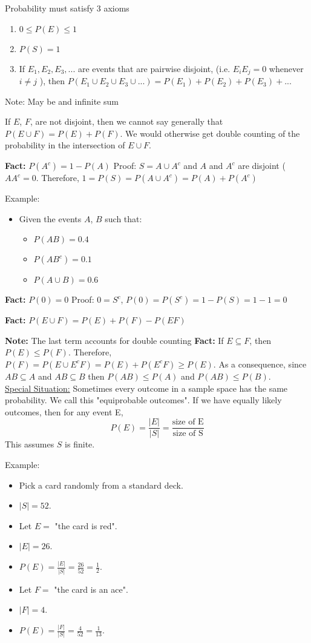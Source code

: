\documentclass[10pt]{article}
\begin{document}
Probability must satisfy 3 axioms
\begin{enumerate}
    \item $ 0 \leq P(E) \leq 1 $
    \item $ P(S) = 1 $
    \item If $E_1, E_2, E_3, ... $ are events that are pairwise disjoint, (i.e.
        $E_iE_j = 0$ whenever $i \neq j$ ), then $P(E_1 \cup E_2 \cup E_3 \cup
        ... ) = P(E_1) + P(E_2) + P(E_3) + ... $
\end{enumerate}
Note: May be and infinite sum

If $E$, $F$, are not disjoint, then we cannot say generally that $P(E \cup F) =
P(E) + P(F)$. We would otherwise get double counting of the probability in the
intersection of $E \cup F$.

\textbf{Fact:} $P(A^c) = 1 - P(A)$
Proof: $S = A \cup A^c$ and $A$ and $A^c$ are disjoint ($AA^c = 0$. Therefore, $1
= P(S) = P(A \cup A^c) = P(A) + P(A^c) $

Example:
\begin{itemize}
    \item Given the events $A$, $B$ such that:
        \begin{itemize}
            \item $P(AB) = 0.4$
            \item $P(AB^c) = 0.1$
            \item $P(A \cup B) = 0.6$
        \end{itemize}
\end{itemize}

\textbf{Fact:} $P(0) = 0$
Proof: $0 = S^c$, $P(0) = P(S^c) = 1 - P(S) = 1 - 1 = 0$

\textbf{Fact:} $P(E \cup F) = P(E) + P(F) - P(EF)$

\textbf{Note:} The last term accounts for double counting
\textbf{Fact:} If $E \subseteq F$, then $P(E) \leq P(F)$. Therefore, $P(F) = P(E
\cup E^cF) = P(E) + P(E^cF) \geq P(E)$. As a consequence, since $AB \subseteq A$
and $AB \subseteq B$ then $P(AB) \leq P(A)$ and $P(AB) \leq P(B)$. \\
\underline{Special Situation:} Sometimes every outcome in a sample space has the
same probability. We call this "equiprobable outcomes". If we have equally
likely outcomes, then for any event E,
$$ P(E) = \frac{|E|}{|S|} = \frac{\text{size of E}}{\text{size of S}}$$
This assumes $S$ is finite.

Example:
\begin{itemize}
    \item Pick a card randomly from a standard deck. 
    \item $|S| = 52$. 
    \item Let $E =$ "the card is red". 
    \item $|E| = 26$. 
    \item $P(E) = \frac{|E|}{|S|} = \frac{26}{52} = \frac{1}{2}$. 
    \item Let $F =$ "the card is an ace". 
    \item $|F| = 4$. 
    \item $P(E) = \frac{|F|}{|S|} = \frac{4}{52} = \frac{1}{13}$. 
\end{itemize}
\end{document}
